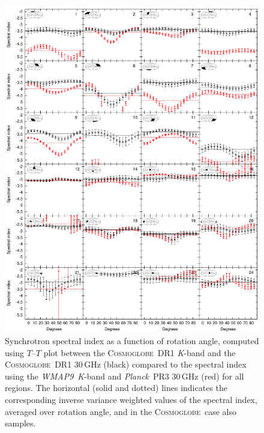 \documentclass[twocolumn]{../../common/aa}
\def\WMAPnine{\emph{WMAP9}}
\def\Planck{\emph{Planck}}
\newcommand{\Cosmoglobe}{\textsc{Cosmoglobe}}
\newcommand{\K}[0]{\textit K}
\begin{document}
\begin{figure}
        \centering
        \includegraphics[width=0.9\linewidth]{figures/cos30_ut_big_multialphaplot_converted.pdf}
        \caption{Synchrotron spectral index as a function of rotation angle, computed using $T$--$T$ plot between the \Cosmoglobe\ DR1 \K-band and the \Cosmoglobe\ DR1 30\,GHz (black) compared to the spectral index using the \WMAPnine\ \K-band and \Planck\ PR3 30\,GHz (red) for all regions. The horizontal (solid and dotted) lines indicates the corresponding inverse variance weighted values of the spectral index, averaged over rotation angle, and in the \Cosmoglobe\ case also samples.}
        \label{fig:cos30_beta_bigalpha}
\end{figure}
\end{document}
